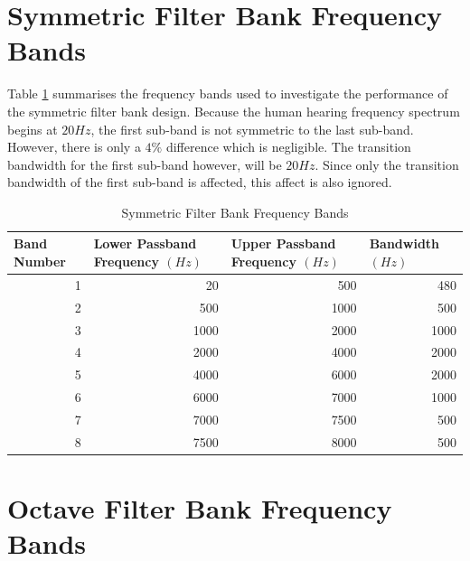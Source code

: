 \documentclass[12pt, onecolumn]{article}
\begin{document}
\begin{appendices}
\section{Symmetric Filter Bank Frequency Bands} 
\label{app:symFreqBands}

\noindent Table \ref{tab:symFreqBand} summarises the frequency bands used to investigate the performance of the symmetric filter bank design. Because the human hearing frequency spectrum begins at $20Hz$, the first sub-band is not symmetric to the last sub-band. However, there is only a $4\%$ difference which is negligible. The transition bandwidth for the first sub-band however, will be $20Hz$. Since only the transition bandwidth of the first sub-band is affected, this affect is also ignored.

\begin{table}[htbp]
  \centering
  \caption{Symmetric Filter Bank Frequency Bands}
  \begin{adjustbox}{width=0.9\linewidth}
    \begin{tabular}{|r|r|r|r|}
    \hline
    \multicolumn{1}{|l|}{\textbf{Band Number}} & \multicolumn{1}{l|}{\textbf{Lower Passband Frequency $(Hz)$}} & \multicolumn{1}{l|}{\textbf{Upper Passband Frequency $(Hz)$}} & \multicolumn{1}{l|}{\textbf{Bandwidth $(Hz)$}} \\
    \hline
    1     & 20    & 500   & 480 \\
    \hline
    2     & 500   & 1000  & 500 \\
    \hline
    3     & 1000  & 2000  & 1000 \\
    \hline
    4     & 2000  & 4000  & 2000 \\
    \hline
    5     & 4000  & 6000  & 2000 \\
    \hline
    6     & 6000  & 7000  & 1000 \\
    \hline
    7     & 7000  & 7500  & 500 \\
    \hline
    8     & 7500  & 8000  & 500 \\
    \hline
    \end{tabular}%
    \end{adjustbox}
  \label{tab:symFreqBand}%
\end{table}%

\section{Octave Filter Bank Frequency Bands}
\label{app:octFreqBands}


\end{appendices}
\end{document}
